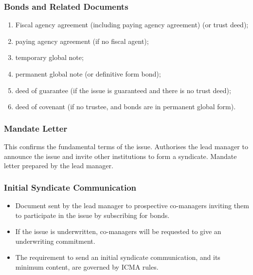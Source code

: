 \documentclass[
]{article}
\providecommand{\tightlist}{%
  \setlength{\itemsep}{0pt}\setlength{\parskip}{0pt}}
\begin{document}
\hypertarget{bonds-and-related-documents}{%
\subsubsection{Bonds and Related
Documents}\label{bonds-and-related-documents}}

\begin{enumerate}
\tightlist
\item
  Fiscal agency agreement (including paying agency agreement) (or trust
  deed);
\item
  paying agency agreement (if no fiscal agent);
\item
  temporary global note;
\item
  permanent global note (or definitive form bond);
\item
  deed of guarantee (if the issue is guaranteed and there is no trust
  deed);
\item
  deed of covenant (if no trustee, and bonds are in permanent global
  form).
\end{enumerate}

\hypertarget{mandate-letter}{%
\subsubsection{Mandate Letter}\label{mandate-letter}}

This confirms the fundamental terms of the issue. Authorises the lead
manager to announce the issue and invite other institutions to form a
syndicate. Mandate letter prepared by the lead manager.

\hypertarget{initial-syndicate-communication}{%
\subsubsection{Initial Syndicate
Communication}\label{initial-syndicate-communication}}

\begin{itemize}
\tightlist
\item
  Document sent by the lead manager to prospective co-managers inviting
  them to participate in the issue by subscribing for bonds.
\item
  If the issue is underwritten, co-managers will be requested to give an
  underwriting commitment.
\item
  The requirement to send an initial syndicate communication, and its
  minimum content, are governed by ICMA rules.
\end{itemize}
\end{document}
